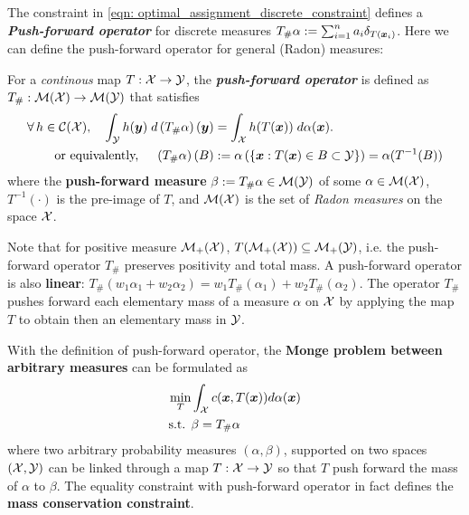 \documentclass[11pt]{article}
\begin{document}
The constraint in \eqref{eqn: optimal_assignment_discrete_constraint} defines a \textbf{\emph{Push-forward operator}} for discrete measures $T_{\#}\alpha :=  \sum_{i=1}^{n}a_i \delta_{T(\boldsymbol{x}_{i})}$. Here we can define the push-forward operator for general (Radon) measures:  
\begin{definition} For a \emph{continous} map $T : {\mathcal X} \rightarrow {\mathcal Y}$,  the \textbf{\emph{push-forward operator}} is defined as $T_{\#}: {\mathcal M}({\mathcal X}) \rightarrow {\mathcal M}({\mathcal Y})$ that  satisfies 
\begin{align}
\forall\, h\in {\mathcal C}({\mathcal X}), \quad \int_{{\mathcal Y}}h(\boldsymbol{y})\; d \left(T_{\#}\alpha\right)(\boldsymbol{y}) &= \int_{{\mathcal X}}h(T(\boldsymbol{x}))\; d\alpha(\boldsymbol{x}). \label{eqn: def_push_forward_opt}\\
\text{or equivalently, } \quad \left(T_{\#}\alpha\right)(B)&:= \alpha\left(\left\{ \boldsymbol{x}: T(\boldsymbol{x}) \in B \subset {\mathcal Y} \right\}\right) = \alpha(T^{-1}(B))  \label{eqn: def_push_forward_opt2}
\end{align} where the \textbf{push-forward measure} $\beta := T_{\#}\alpha \in {\mathcal M}({\mathcal Y})$ of some $\alpha \in  {\mathcal M}({\mathcal X})$, $T^{-1}(\cdot)$ is the pre-image of $T$, and ${\mathcal M}({\mathcal X})$ is the set of \emph{Radon measures} on the space ${\mathcal X}$. 
\end{definition} Note that for positive measure ${\mathcal M}_{+}({\mathcal X})$, $T({\mathcal M}_{+}({\mathcal X})) \subseteq {\mathcal M}_{+}({\mathcal Y})$, i.e. the push-forward operator $T_{\#}$ preserves positivity and total mass. A push-forward operator is also \textbf{linear}: $T_{\#}(w_1\alpha_1 + w_2\alpha_2) = w_1 T_{\#}(\alpha_1) + w_2 T_{\#}(\alpha_2) $. The operator $T_{\#}$ pushes forward each elementary mass of a measure $\alpha$ on ${\mathcal X}$ by applying the map $T$ to obtain then an elementary mass in ${\mathcal Y}$. 

With the definition of push-forward operator, the \textbf{Monge problem between arbitrary measures} can be formulated as
\begin{align}
\min_{T}& \int_{{\mathcal X}} c(\boldsymbol{x}, T(\boldsymbol{x})) d\alpha (\boldsymbol{x}) \label{eqn: optimal_assignment_cont}\\
\text{s.t. }& \beta = T_{\#}\alpha
\end{align} where two arbitrary probability measures $(\alpha, \beta)$, supported on two spaces $({\mathcal X} , {\mathcal Y})$ can be linked through a map $T : {\mathcal X} \rightarrow {\mathcal Y}$ so that $T$ push forward the mass of $\alpha$ to $\beta$. The equality constraint with push-forward operator in fact defines the \textbf{mass conservation constraint}.
\end{document}
